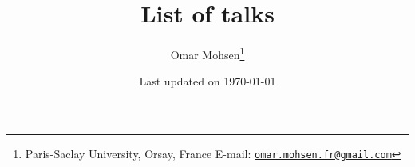 \documentclass[a4paper, 13pt]{article}
\begin{document}
\title{List of talks}
\author{Omar Mohsen\thanks{
Paris-Saclay University, Orsay, France
\vskip-2pt E-mail: \href{mailto:omar.mohsen.fr@gmail.com}{\texttt{omar.mohsen.fr@gmail.com}}}}
\date{Last updated on \today}
\maketitle
\end{document}
